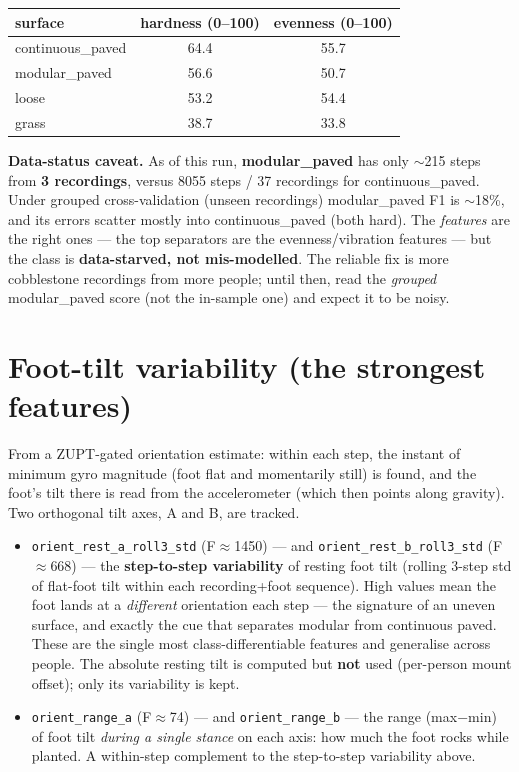 \documentclass[11pt]{article}
\newcommand{\cls}[1]{\textbf{#1}}
\begin{document}
\begin{center}
\begin{tabular}{lcc}
\toprule
\textbf{surface} & \textbf{hardness (0--100)} & \textbf{evenness (0--100)}\\
\midrule
continuous\_paved & 64.4 & 55.7\\
modular\_paved    & 56.6 & 50.7\\
loose            & 53.2 & 54.4\\
grass            & 38.7 & 33.8\\
\bottomrule
\end{tabular}
\end{center}

\noindent\textbf{Data-status caveat.} As of this run, \cls{modular\_paved} has only $\sim$215
steps from \textbf{3 recordings}, versus 8055 steps / 37 recordings for continuous\_paved.
Under grouped cross-validation (unseen recordings) modular\_paved F1 is $\sim$18\%, and its errors
scatter mostly into continuous\_paved (both hard). The \emph{features} are the right ones --- the
top separators are the evenness/vibration features --- but the class is \textbf{data-starved, not
mis-modelled}. The reliable fix is more cobblestone recordings from more people; until then, read
the \emph{grouped} modular\_paved score (not the in-sample one) and expect it to be noisy.

\section{Foot-tilt variability (the strongest features)}
From a ZUPT-gated orientation estimate: within each step, the instant of minimum gyro magnitude
(foot flat and momentarily still) is found, and the foot's tilt there is read from the
accelerometer (which then points along gravity). Two orthogonal tilt axes, A and B, are tracked.
\begin{itemize}
\item \texttt{orient\_rest\_a\_roll3\_std} (F$\approx$1450) --- and \texttt{orient\_rest\_b\_roll3\_std} (F$\approx$668) --- the \textbf{step-to-step variability} of resting foot tilt (rolling 3-step std of flat-foot tilt within each recording+foot sequence). High values mean the foot lands at a \emph{different} orientation each step --- the signature of an uneven surface, and exactly the cue that separates modular from continuous paved. These are the single most class-differentiable features and generalise across people. The absolute resting tilt is computed but \textbf{not} used (per-person mount offset); only its variability is kept.
\item \texttt{orient\_range\_a} (F$\approx$74) --- and \texttt{orient\_range\_b} --- the range (max$-$min) of foot tilt \emph{during a single stance} on each axis: how much the foot rocks while planted. A within-step complement to the step-to-step variability above.
\end{itemize}
\end{document}
